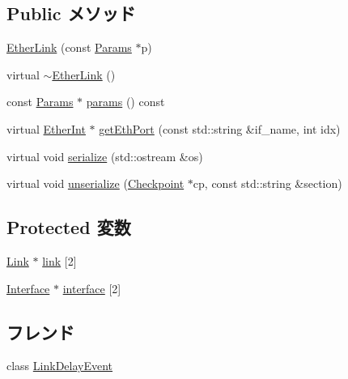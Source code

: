 \subsection*{Public メソッド}
\begin{DoxyCompactItemize}
\item 
\hyperlink{classEtherLink_aff68549aceac9fb85c892f8c57b5b0cb}{EtherLink} (const \hyperlink{classEtherLink_ae2a807ee6467a63dfb496f847857b7df}{Params} $\ast$p)
\item 
virtual \hyperlink{classEtherLink_a4e767b432033b81f3bd4352f8c9b046e}{$\sim$EtherLink} ()
\item 
const \hyperlink{classEtherLink_ae2a807ee6467a63dfb496f847857b7df}{Params} $\ast$ \hyperlink{classEtherLink_acd3c3feb78ae7a8f88fe0f110a718dff}{params} () const 
\item 
virtual \hyperlink{classEtherInt}{EtherInt} $\ast$ \hyperlink{classEtherLink_a10260c5a583c0894dcdcd1ced50a53ae}{getEthPort} (const std::string \&if\_\-name, int idx)
\item 
virtual void \hyperlink{classEtherLink_ad6272f80ae37e8331e3969b3f072a801}{serialize} (std::ostream \&os)
\item 
virtual void \hyperlink{classEtherLink_af100c4e9feabf3cd918619c88c718387}{unserialize} (\hyperlink{classCheckpoint}{Checkpoint} $\ast$cp, const std::string \&section)
\end{DoxyCompactItemize}
\subsection*{Protected 変数}
\begin{DoxyCompactItemize}
\item 
\hyperlink{classEtherLink_1_1Link}{Link} $\ast$ \hyperlink{classEtherLink_a50d0cd7994bfc3d687f328f1e292c7ab}{link} \mbox{[}2\mbox{]}
\item 
\hyperlink{classEtherLink_1_1Interface}{Interface} $\ast$ \hyperlink{classEtherLink_ac7117d0bc6bfdce6b73ab381c847909a}{interface} \mbox{[}2\mbox{]}
\end{DoxyCompactItemize}
\subsection*{フレンド}
\begin{DoxyCompactItemize}
\item 
class \hyperlink{classEtherLink_ae08a8e78387040792a618717ab8c6332}{LinkDelayEvent}
\end{DoxyCompactItemize}


